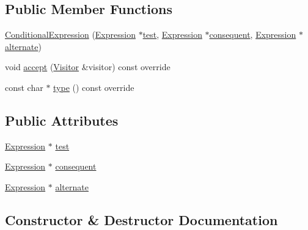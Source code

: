 \subsection*{Public Member Functions}
\begin{DoxyCompactItemize}
\item 
\hyperlink{struct_conditional_expression_a37e1422b06b5533f67a85ceb92e9ae1e}{Conditional\+Expression} (\hyperlink{struct_expression}{Expression} $\ast$\hyperlink{struct_conditional_expression_a7bfe134769078a10eecccabba7405cc2}{test}, \hyperlink{struct_expression}{Expression} $\ast$\hyperlink{struct_conditional_expression_ac129a280df90c129183ec955f4e50ed0}{consequent}, \hyperlink{struct_expression}{Expression} $\ast$\hyperlink{struct_conditional_expression_aed7b09dab98000c8542d6353eefd8dac}{alternate})
\item 
void \hyperlink{struct_conditional_expression_af3883c99eba0226e3fbd424a672bcf7b}{accept} (\hyperlink{struct_visitor}{Visitor} \&visitor) const override
\item 
const char $\ast$ \hyperlink{struct_conditional_expression_a3674bdc7e784cf84037aa273ebde4745}{type} () const override
\end{DoxyCompactItemize}
\subsection*{Public Attributes}
\begin{DoxyCompactItemize}
\item 
\hyperlink{struct_expression}{Expression} $\ast$ \hyperlink{struct_conditional_expression_a7bfe134769078a10eecccabba7405cc2}{test}
\item 
\hyperlink{struct_expression}{Expression} $\ast$ \hyperlink{struct_conditional_expression_ac129a280df90c129183ec955f4e50ed0}{consequent}
\item 
\hyperlink{struct_expression}{Expression} $\ast$ \hyperlink{struct_conditional_expression_aed7b09dab98000c8542d6353eefd8dac}{alternate}
\end{DoxyCompactItemize}


\subsection{Constructor \& Destructor Documentation}
\mbox{\label{struct_conditional_expression_a37e1422b06b5533f67a85ceb92e9ae1e}} 
